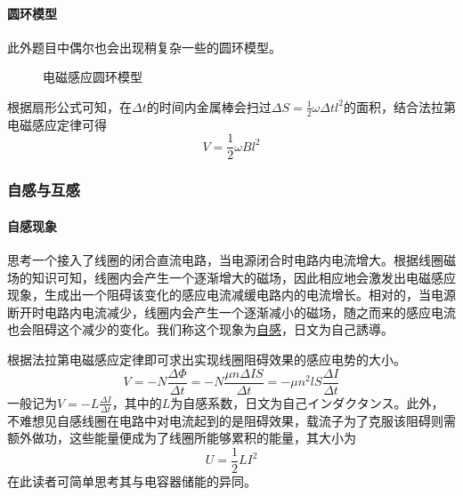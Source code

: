 \paragraph{圆环模型}此外题目中偶尔也会出现稍复杂一些的圆环模型。
\begin{figure}[ht!]
    \centering
    \caption{电磁感应圆环模型}
\end{figure}
根据扇形公式可知，在$\Delta t$的时间内金属棒会扫过$\Delta S=\frac12\omega\Delta tl^2$的面积，结合法拉第电磁感应定律可得
\begin{equation*}
    V=\frac12\omega Bl^2
\end{equation*}

\subsubsection{自感与互感}

\paragraph{自感现象} 思考一个接入了线圈的闭合直流电路，当电源闭合时电路内电流增大。根据线圈磁场的知识可知，线圈内会产生一个逐渐增大的磁场，因此相应地会激发出电磁感应现象，生成出一个阻碍该变化的感应电流减缓电路内的电流增长。相对的，当电源断开时电路内电流减少，线圈内会产生一个逐渐减小的磁场，随之而来的感应电流也会阻碍这个减少的变化。我们称这个现象为\underline{自感}，日文为自己誘導。

根据法拉第电磁感应定律即可求出实现线圈阻碍效果的感应电势的大小。
\begin{equation*}
    V=-N\frac{\Delta\Phi}{\Delta t}
    =-N\frac{\mu n\Delta IS}{\Delta t}
    =-\mu n^2lS\frac{\Delta I}{\Delta t}
\end{equation*}
一般记为$V=-L\frac{\Delta I}{\Delta t}$，其中的$L$为自感系数，日文为自己インダクタンス。此外，不难想见自感线圈在电路中对电流起到的是阻碍效果，载流子为了克服该阻碍则需额外做功，这些能量便成为了线圈所能够累积的能量，其大小为
\begin{equation*}
    U=\frac12LI^2
\end{equation*}
在此读者可简单思考其与电容器储能的异同。

